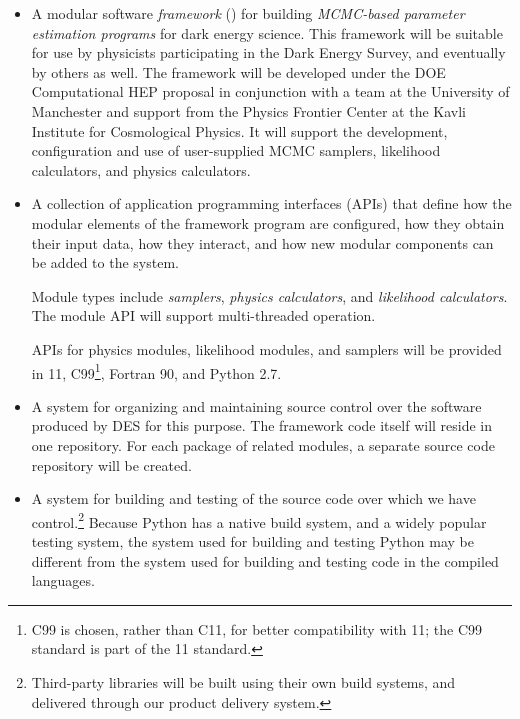 \documentclass{memarticle}
\newcommand{\facs}{\name{FACS}\xspace}
\newcommand{\cosmosis}{\name{CosmoSIS}\xspace}
\begin{document}
\begin{itemize}

\item A modular software \emph{framework} (\cosmosis) for building
  \emph{MCMC-based parameter estimation programs} for dark energy
  science. This framework will be suitable for use by physicists
  participating in the Dark Energy Survey, and eventually by others as
  well. The framework will be developed under the DOE Computational HEP
  \facs proposal in conjunction with a team at the University of Manchester and support from the Physics Frontier Center at the Kavli Institute for Cosmological Physics. It will support the development, configuration and use
  of user-supplied MCMC samplers, likelihood calculators, and physics
  calculators.

\item A collection of application programming interfaces (APIs) that
  define how the modular elements of the framework program are
  configured, how they obtain their input data, how they interact, and
  how new modular components can be added to the system.

  Module types include \emph{samplers}, \emph{physics calculators}, and
  \emph{likelihood calculators}. The module API will support
  multi-threaded operation.


  APIs for physics modules, likelihood modules, and samplers will be
  provided in \cpp{}11, C99\footnote{C99 is chosen, rather than C11, for
    better compatibility with \cpp{}11; the C99 standard is part of the
    \cpp{}11 standard.}, Fortran 90, and Python 2.7.

\item A system for organizing and maintaining source control over the
  software produced by DES for this purpose. The \cosmosis framework
  code itself will reside in one repository. For each package of related
  modules, a separate source code repository will be created.

\item A system for building and testing of the source code over which we
  have control.\footnote{Third-party libraries will be built using their
    own build systems, and delivered through our product delivery
    system.} Because Python has a native build system, and a widely
  popular testing system, the system used for building and testing
  Python may be different from the system used for building and testing
  code in the compiled languages.


\end{itemize}
\end{document}
